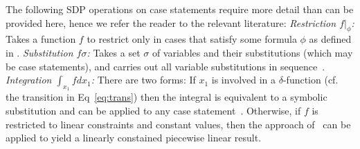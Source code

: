 \documentclass{article} %
\begin{document}
The following SDP operations on case statements require more detail than can be provided here, hence we refer the reader to the relevant literature:
{\it Restriction $f|_{\phi}$:}  Takes a function $f$ to restrict only in cases
that satisfy some formula $\phi$ as defined in \cite{sanner_uai11}.
{\it Substitution $f\sigma$:} Takes a set $\sigma$ of variables and their substitutions (which may be case statements), and carries out all variable substitutions in sequence~\cite{sanner_uai11}.
{\it Integration $\int_{x_1} f dx_1$:}  There are two forms: If $x_1$ is involved in a $\delta$-function (cf. the transition in Eq~\eqref{eq:trans}) then the integral is equivalent to a symbolic substitution and can be applied to any case statement~\cite{sanner_uai11}. Otherwise, if $f$ is restricted to linear constraints and constant values, then the approach of~\cite{sanner_aaai12} can be applied to yield a linearly constained piecewise linear result.
\end{document}
